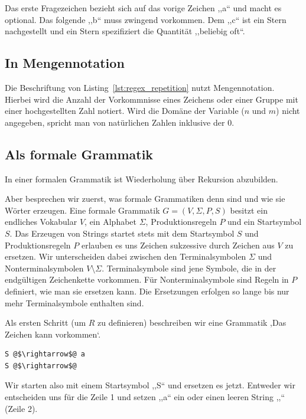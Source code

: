 Das erste Fragezeichen bezieht sich auf das vorige Zeichen ,,a`` und macht es optional. Das folgende ,,b`` muss zwingend vorkommen. Dem ,,c`` ist ein Stern nachgestellt und ein Stern spezifiziert die Quantität ,,beliebig oft``.

\subsection{In Mengennotation}
%
Die Beschriftung von Listing~\ref{lst:regex_repetition} nutzt Mengennotation. Hierbei wird die Anzahl der Vorkommnisse eines Zeichens oder einer Gruppe mit einer hochgestellten Zahl notiert. Wird die Domäne der Variable ($n$ und $m$) nicht angegeben, spricht man von natürlichen Zahlen inklusive der 0.

\subsection{Als formale Grammatik}
%
In einer formalen Grammatik ist Wiederholung über Rekursion abzubilden.

Aber besprechen wir zuerst, was formale Grammatiken denn sind und wie sie Wörter erzeugen. Eine formale Grammatik $G = (V, \Sigma, P, S)$ besitzt ein endliches Vokabular $V$, ein Alphabet $\Sigma$, Produktionsregeln $P$ und ein Startsymbol $S$. Das Erzeugen von Strings startet stets mit dem Startsymbol $S$ und Produktionsregeln $P$ erlauben es uns Zeichen sukzessive durch Zeichen aus $V$ zu ersetzen. Wir unterscheiden dabei zwischen den Terminalsymbolen $\Sigma$ und Nonterminalsymbolen $V \setminus \Sigma$. Terminalsymbole sind jene Symbole, die in der endgültigen Zeichenkette vorkommen. Für Nonterminalsymbole sind Regeln in $P$ definiert, wie man sie ersetzen kann. Die Ersetzungen erfolgen so lange bis nur mehr Terminalsymbole enthalten sind.

Als ersten Schritt (um $R$ zu definieren) beschreiben wir eine Grammatik ,Das Zeichen  kann vorkommen`.
\begin{lstlisting}
S @$\rightarrow$@ a
S @$\rightarrow$@
\end{lstlisting}

Wir starten also mit einem Startsymbol ,,S`` und ersetzen es jetzt. Entweder wir entscheiden uns für die Zeile 1 und setzen ,,a`` ein oder einen leeren String ,,`` (Zeile 2).


